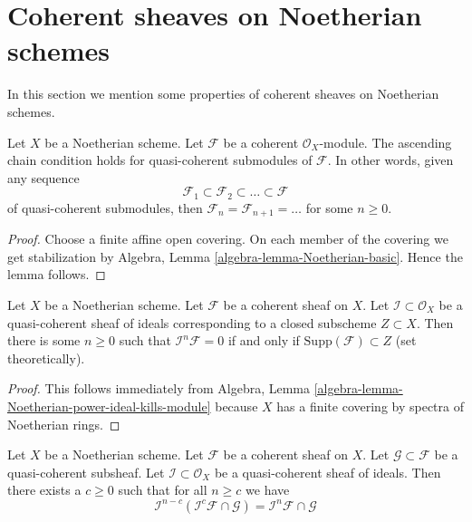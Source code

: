 \section{Coherent sheaves on Noetherian schemes}
\label{section-coherent-quasi-compact}

\noindent
In this section we mention some properties of coherent sheaves on
Noetherian schemes.

\begin{lemma}
\label{lemma-acc-coherent}
Let $X$ be a Noetherian scheme.
Let $\mathcal{F}$ be a coherent $\mathcal{O}_X$-module.
The ascending chain condition holds for quasi-coherent submodules
of $\mathcal{F}$. In other words, given any sequence
$$
\mathcal{F}_1 \subset \mathcal{F}_2 \subset \ldots \subset \mathcal{F}
$$
of quasi-coherent submodules, then
$\mathcal{F}_n = \mathcal{F}_{n + 1} = \ldots $ for some $n \geq 0$.
\end{lemma}

\begin{proof}
Choose a finite affine open covering.
On each member of the covering we get stabilization by
Algebra, Lemma \ref{algebra-lemma-Noetherian-basic}.
Hence the lemma follows.
\end{proof}

\begin{lemma}
\label{lemma-power-ideal-kills-sheaf}
Let $X$ be a Noetherian scheme.
Let $\mathcal{F}$ be a coherent sheaf on $X$.
Let $\mathcal{I} \subset \mathcal{O}_X$ be a quasi-coherent
sheaf of ideals corresponding to a closed subscheme $Z \subset X$.
Then there is some $n \geq 0$ such that $\mathcal{I}^n\mathcal{F} = 0$
if and only if $\text{Supp}(\mathcal{F}) \subset Z$ (set theoretically).
\end{lemma}

\begin{proof}
This follows immediately from
Algebra, Lemma \ref{algebra-lemma-Noetherian-power-ideal-kills-module}
because $X$ has a finite covering by spectra of Noetherian rings.
\end{proof}

\begin{lemma}
\label{lemma-Artin-Rees}
Let $X$ be a Noetherian scheme.
Let $\mathcal{F}$ be a coherent sheaf on $X$.
Let $\mathcal{G} \subset \mathcal{F}$ be a quasi-coherent subsheaf.
Let $\mathcal{I} \subset \mathcal{O}_X$ be a quasi-coherent sheaf of
ideals.
Then there exists a $c \geq 0$ such that for all $n \geq c$ we
have
$$
\mathcal{I}^{n - c}(\mathcal{I}^c\mathcal{F} \cap \mathcal{G})
=
\mathcal{I}^n\mathcal{F} \cap \mathcal{G}
$$
\end{lemma}

